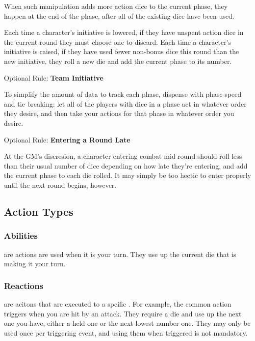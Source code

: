 \begin{multicols}{2}
         When such manipulation adds more action dice to the current phase, they happen at the end of the phase, after all of the existing dice have been used.

         Each time a character's initiative is lowered, if they have unspent action dice in the current round they must choose one to discard. Each time a character's initiative is raised, if they have used fewer non-bonus dice this round than the new initiative, they roll a new die and add the current phase to its number.

        \begin{boco}
            Optional Rule: \textbf{Team Initiative}\pc%

            To simplify the amount of data to track each phase, dispense with phase speed and tie breaking: let all of the players with dice in a phase act in whatever order they desire, and then take your actions for that phase in whatever order you desire.\pw%

             Optional Rule: \textbf{Entering a Round Late}\pc%

            At the GM's discresion, a character entering combat mid-round should roll less than their usual number of dice depending on how late they're entering, and add the current phase to each die rolled. It may simply be too hectic to enter properly until the next round begins, however. 

        \end{boco}

    \subsection{Action Types}\label{subsec:actions}

        \subsubsection{Abilities}
             are actions are used when it is your turn. They use up the current die that is making it your turn.
        
        \subsubsection{Reactions}
             are acitons that are executed to a speific . For example, the common action  triggers when you are hit by an attack. They require a die and use up the next one you have, either a held one or the next lowest number one. They may only be used once per triggering event, and using them when triggered is not mandatory.


\end{multicols}
